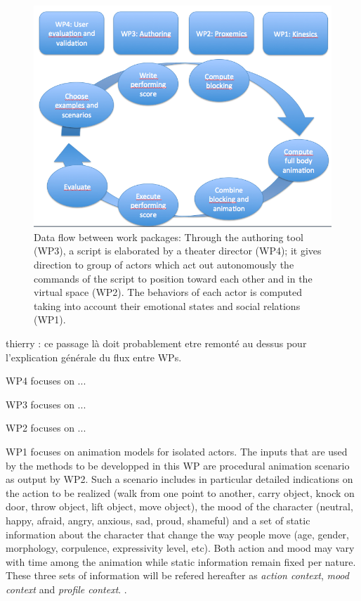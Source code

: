 \begin{figure}[htbp]
\begin{center}
\includegraphics[width=\linewidth]{DADAWORKFLOW.png}
\caption{Data flow between work packages: Through the authoring tool (WP3), a script is elaborated by a theater director (WP4); it gives direction to group of actors which act out autonomously the commands of the script to position toward each other and in the virtual space (WP2). The behaviors of each actor is computed taking into account their emotional states and social relations (WP1).}
\label{default}
\end{center}
\end{figure}



\begin{xcomment}  
thierry : ce passage là doit probablement etre remonté au dessus pour l'explication générale du flux entre WPs. 
\end{xcomment}


WP4 focuses on ...

WP3 focuses on ...

WP2 focuses on ...


WP1 focuses on animation models for isolated actors.  The inputs that are used by the methods to be developped in this WP are procedural animation scenario as output by WP2.  Such a scenario includes in particular detailed indications on the action to be realized (walk from one point to another, carry object, knock on door, throw object, lift object, move object), the mood of the character (neutral, happy, afraid, angry, anxious, sad, proud, shameful) and a set of static information about the character that change the way people move (age, gender, morphology, corpulence, expressivity level, etc). Both action and mood may vary with time among the animation while static information remain fixed per nature.  These three sets of information will be refered hereafter as \textit{action context}, \textit{mood context} and \textit{profile context}. . 


\endinput